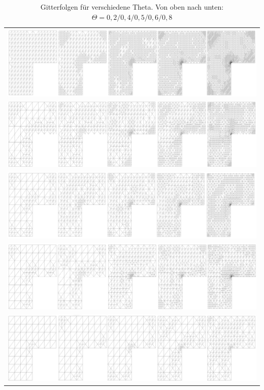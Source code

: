\begin{table}[!htbp]
	\begin{tabular}{c}
		\includegraphics[width=15.5cm]{pics/grid02.png} \\
		\includegraphics[width=15.5cm]{pics/grid04.png} \\
		\includegraphics[width=15.5cm]{pics/grid05.png} \\
		\includegraphics[width=15.5cm]{pics/grid06.png} \\
		\includegraphics[width=15.5cm]{pics/grid08.png} \\
	\end{tabular}
	\caption{ \label{tabelle} Gitterfolgen für verschiedene Theta. Von oben nach unten: $\Theta = 0,2/0,4/0,5/0,6/0,8$}
\end{table}

